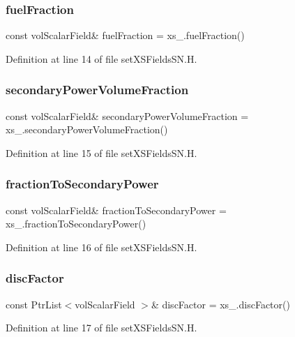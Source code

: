 \subsubsection{\texorpdfstring{fuel\+Fraction}{fuelFraction}}
{\footnotesize\ttfamily const vol\+Scalar\+Field\& fuel\+Fraction = xs\+\_\+.\+fuel\+Fraction()}



Definition at line 14 of file set\+X\+S\+Fields\+S\+N.\+H.

\mbox{\label{setXSFieldsSN_8H_a8a174336055259a9d6e186e9ceb2f629}} 
\subsubsection{\texorpdfstring{secondary\+Power\+Volume\+Fraction}{secondaryPowerVolumeFraction}}
{\footnotesize\ttfamily const vol\+Scalar\+Field\& secondary\+Power\+Volume\+Fraction = xs\+\_\+.\+secondary\+Power\+Volume\+Fraction()}



Definition at line 15 of file set\+X\+S\+Fields\+S\+N.\+H.

\mbox{\label{setXSFieldsSN_8H_a333f327f48d6300db4dcab219afd7d02}} 
\subsubsection{\texorpdfstring{fraction\+To\+Secondary\+Power}{fractionToSecondaryPower}}
{\footnotesize\ttfamily const vol\+Scalar\+Field\& fraction\+To\+Secondary\+Power = xs\+\_\+.\+fraction\+To\+Secondary\+Power()}



Definition at line 16 of file set\+X\+S\+Fields\+S\+N.\+H.

\mbox{\label{setXSFieldsSN_8H_aadc616dab27c2f3869b5259826f59f76}} 
\subsubsection{\texorpdfstring{disc\+Factor}{discFactor}}
{\footnotesize\ttfamily const Ptr\+List$<$vol\+Scalar\+Field $>$\& disc\+Factor = xs\+\_\+.\+disc\+Factor()}



Definition at line 17 of file set\+X\+S\+Fields\+S\+N.\+H.

